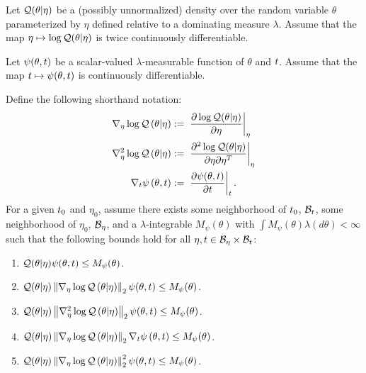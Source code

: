 \begin{assu}
%
Let $\mathcal{Q}(\theta \vert \eta)$ be a (possibly unnormalized) density over the random
variable $\theta$ parameterized by $\eta$ defined relative to a dominating
measure $\lambda$.  Assume that the map $\eta \mapsto \log \mathcal{Q}(\theta \vert
\eta)$ is twice continuously differentiable.

Let $\psi(\theta, t)$ be a scalar-valued $\lambda$-measurable function of
$\theta$ and $t$.  Assume that the map $t \mapsto \psi(\theta, t)$ is
continuously differentiable.

Define the following shorthand notation:
%
\begin{align*}
%
\lqgrad{\theta \vert \eta} :={}&
    \fracat{\partial \log \q(\theta \vert \eta)}{\partial \eta}{\eta} \\
%
\lqhess{\theta \vert \eta} :={}&
    \fracat{\partial^2 \log \q(\theta \vert \eta)}
           {\partial \eta \partial \eta^T}{\eta} \\
%
\psigrad{\theta, \t} :={}& \fracat{\partial \psi(\theta, \t)}{\partial \t}{\t}.
%
\end{align*}
%
For a given $t_0$ and $\eta_0$, assume there exists some neighborhood of
$t_0$, $\mathcal{B}_t$, some neighborhood of $\eta_0$, $\mathcal{B}_\eta$, and a
$\lambda$-integrable $M_\psi(\theta)$ with $\int M_\psi(\theta) \lambda(d\theta) <
\infty$ such that the following bounds hold for all $\eta, t \in \mathcal{B}_\eta
\times \mathcal{B}_t$:
%
\begin{enumerate}
%
\item {}
$\mathcal{Q}(\theta \vert \eta) \psi(\theta, t) \le M_\psi(\theta)$.
%
\item {}
$\mathcal{Q}(\theta \vert \eta) \left\Vert{\nabla_\eta \log \mathcal{Q}}\left(\theta \vert \eta\right)\right\Vert_2 \psi(\theta, t) \le
M_\psi(\theta)$.
%
\item {}
$\mathcal{Q}(\theta \vert \eta) \left\Vert{\nabla_\eta^2 \log \mathcal{Q}}\left(\theta \vert \eta\right)\right\Vert_2 \psi(\theta, t) \le
M_\psi(\theta)$.
%
\item {}
$\mathcal{Q}(\theta \vert \eta) \left\Vert{\nabla_\eta \log \mathcal{Q}}\left(\theta \vert \eta\right)\right\Vert_2 {\nabla_t \psi}\left(\theta, t\right)
\le M_\psi(\theta)$.
%
\item {}
$\mathcal{Q}(\theta \vert \eta) \left\Vert{\nabla_\eta \log \mathcal{Q}}\left(\theta \vert \eta\right)\right\Vert^2_2 \psi(\theta, t) \le
M_\psi(\theta)$.
%
\end{enumerate}
%
\end{assu}

